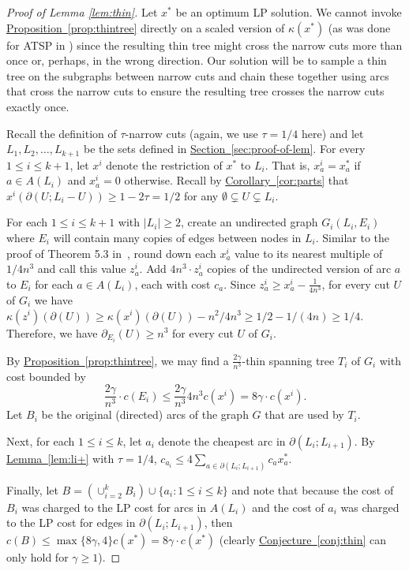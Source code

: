 \documentclass[11pt]{article}
\newcommand{\lref}[2][]{\hyperref[#2]{#1~\ref*{#2}}}
\theoremstyle{definition}
\def\A{{B}}
\newcounter{note}[section]
\begin{document}
\begin{proof}[Proof of Lemma \ref{lem:thin}]
Let $x^*$ be an optimum LP solution. We cannot invoke \lref[Proposition]{prop:thintree} directly on a scaled version of $\kappa(x^*)$
(as was done for ATSP in \cite{GS11}) since the resulting thin tree might cross the narrow cuts more than once or, perhaps, in the wrong direction.
Our solution will be to sample a thin tree on the subgraphs between narrow cuts and chain these together using arcs that cross the narrow cuts
to ensure the resulting tree crosses the narrow cuts exactly once.

Recall the definition of $\tau$-narrow cuts (again, we use $\tau = 1/4$ here)
and let $L_1, L_2, \ldots, L_{k+1}$ be the sets defined in \lref[Section]{sec:proof-of-lem}.
For every $1 \leq i \leq k+1$, let $x^i$ denote the restriction of $x^*$ to $L_i$. That is, $x^i_a = x^*_a$ if $a \in A(L_i)$ and $x^i_a = 0$ otherwise.
Recall by \lref[Corollary]{cor:parts} that $x^i(\partial(U; L_i-U)) \geq 1-2\tau = 1/2$ for any $\emptyset \subsetneq U \subsetneq L_i$.

For each $1 \leq i \leq k+1$ with $|L_i| \geq 2$, create an undirected graph $G_i(L_i, E_i)$ where $E_i$ will contain many copies of edges between nodes in $L_i$.
Similar to the proof of Theorem 5.3 in~\cite{GS11}, round down each $x^i_a$ value to its nearest multiple of $1/4n^3$ and call this value $z^i_a$.
Add $4n^3 \cdot z^i_a$ copies of the undirected version of arc $a$ to $E_i$ for each $a \in A(L_i)$, each with cost $c_a$.
Since $z^i_a\geq x^i_a-\frac{1}{4n^3}$, for every cut $U$ of $G_i$ we have $\kappa(z^i)(\partial(U)) \geq \kappa(x^i)(\partial(U)) - n^2/4n^3 \geq 1/2 - 1/(4n) \geq 1/4$.
Therefore, we have $\partial_{E_i}(U) \geq n^3$ for every cut $U$ of $G_i$.

By \lref[Proposition]{prop:thintree}, we may find a $\frac{2\gamma}{n^3}$-thin spanning tree $T_i$ of $G_i$ with cost bounded by
\[ \frac{2\gamma}{n^3} \cdot c(E_i) \leq \frac{2\gamma}{n^3} 4 n^3 c(x^i) = 8\gamma \cdot c(x^i). \]
Let $ \A_i$ be the original (directed) arcs of the graph $G$ that are used by $T_i$.

Next, for each $1 \leq i \leq k$, let $a_i$ denote the cheapest arc in $\partial(L_i;L_{i+1})$. By \lref[Lemma]{lem:li+}
with $\tau = 1/4$, $c_{a_i} \leq 4 \sum_{a \in \partial(L_i;L_{i+1})} c_a x^*_a$.

Finally, let $ \A = \left(\cup_{i=2}^k  \A_i\right) \cup \{a_i : 1 \leq i \leq k\}$ and note that because the cost of $ \A_i$ was
charged to the LP cost for arcs in $A(L_i)$ and the cost of $a_i$ was charged to the LP cost for edges in $\partial(L_i; L_{i+1})$, then
$c(\A) \leq \max\{8\gamma, 4\} c(x^*) = 8\gamma \cdot c(x^*)$ (clearly \lref[Conjecture]{conj:thin} can only hold for $\gamma \geq 1$).


\end{proof}
\end{document}
